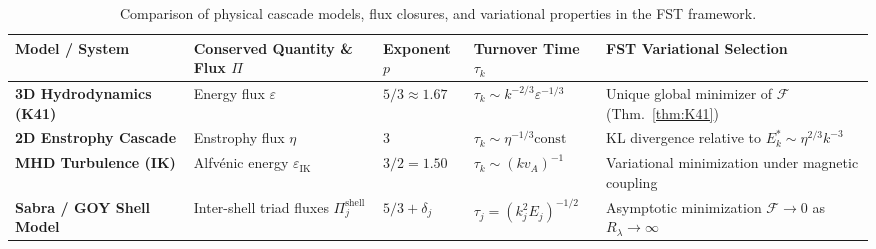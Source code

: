 \documentclass[12pt,a4paper]{article}
\theoremstyle{breakdef}
\theoremstyle{breakplain}
\theoremstyle{breakdef}
\begin{document}
\begin{table}[htbp]
\centering
\footnotesize
\caption{Comparison of physical cascade models, flux closures, and variational properties in the FST framework.}
\label{tab:closure-comparison}
\vspace{4pt}
\setlength{\tabcolsep}{3.5pt}
\renewcommand{\arraystretch}{1.15}
\begin{tabularx}{\textwidth}{>{\raggedright\arraybackslash}p{2.8cm} Y >{\centering\arraybackslash}p{1.7cm} >{\raggedright\arraybackslash}p{2.7cm} Y}
\toprule
\textbf{Model / System} & \textbf{Conserved Quantity \& Flux $\Pi$} & \textbf{Exponent $p$} & \textbf{Turnover Time $\tau_k$} & \textbf{FST Variational Selection} \\
\midrule
\textbf{3D Hydrodynamics (K41)} & Energy flux $\varepsilon$ & $5/3 \approx 1.67$ & $\tau_k \sim k^{-2/3}\varepsilon^{-1/3}$ & Unique global minimizer of $\mathcal{F}$ (Thm.~\ref{thm:K41}) \\
\addlinespace[2pt]
\textbf{2D Enstrophy Cascade} & Enstrophy flux $\eta$ & $3$ & $\tau_k \sim \eta^{-1/3} \mathrm{const}$ & KL divergence relative to $E_k^* \sim \eta^{2/3} k^{-3}$ \\
\addlinespace[2pt]
\textbf{MHD Turbulence (IK)} & Alfv\'enic energy $\varepsilon_{\mathrm{IK}}$ & $3/2 = 1.50$ & $\tau_k \sim (k v_A)^{-1}$ & Variational minimization under magnetic coupling \\
\addlinespace[2pt]
\textbf{Sabra / GOY Shell Model} & Inter-shell triad fluxes $\Pi_j^{\mathrm{shell}}$ & $5/3 + \delta_j$ & $\tau_j = (k_j^2 E_j)^{-1/2}$ & Asymptotic minimization $\mathcal{F} \to 0$ as $R_\lambda \to \infty$ \\
\bottomrule
\end{tabularx}
\end{table}
\end{document}
